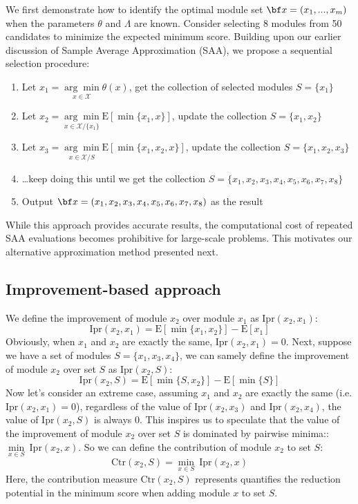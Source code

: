 \documentclass[opre,sglanonrev]{informs4}
\begin{document}
We first demonstrate how to identify the optimal module set ${\bf x} = (x_{1},...,x_{m})$ when the parameters $\theta$ and $\Lambda$ are known. Consider selecting 8 modules from 50 candidates to minimize the expected minimum score. Building upon our earlier discussion of Sample Average Approximation (SAA), we propose a sequential selection procedure:
\begin{enumerate}
	\item Let $x_1 = \underset{x\in \mathcal{X}}{{\arg\min}} \theta(x)$, get the collection of selected modules $S = \{x_1\}$
	\item Let $x_2 = \underset{x\in \mathcal{X}/\{x_1\}}{{\arg\min}}\text{E}[\min\{x_1, x\}]$, update the collection $S = \{x_1,x_2\}$
	\item Let $x_3 = \underset{x\in \mathcal{X}/S}{{\arg\min}}\text{E}[\min\{x_1, x_2, x\}]$, update the collection $S = \{x_1,x_2,x_3\}$
	\item \ldots keep doing this until we get the collection $S = \{x_1,x_2,x_3,x_4,x_5,x_6,x_7,x_8\}$
	\item Output ${\bf x} = (x_1,x_2,x_3,x_4,x_5,x_6,x_7,x_8)$ as the result
\end{enumerate}
While this approach provides accurate results, the computational cost of repeated SAA evaluations becomes prohibitive for large-scale problems. This motivates our alternative approximation method presented next.

\subsection{Improvement-based approach}
We define the improvement of module $x_2$ over module $x_1$ as $\text{Ipr}(x_2, x_1)$:
$$
\text{Ipr}(x_2, x_1) = \text{E}[\min\{x_1, x_2\}]-\text{E}[x_1] 
$$
Obviously, when $x_1$ and $x_2$ are exactly the same, $\text{Ipr}(x_2, x_1) = 0$.
Next, suppose we have a set of modules $S = \{x_1,x_3,x_4\}$, we can samely define the improvement of module $x_2$ over set $S$ as $\text{Ipr}(x_2, S)$:
$$
\text{Ipr}(x_2, S) = \text{E}[\min\{S, x_2\}]-\text{E}[\min\{S\}]
$$
Now let's consider an extreme case, assuming $x_1$ and $x_2$ are exactly the same (i.e. $\text{Ipr}(x_2, x_1)=0$), regardless of the value of $\text{Ipr}(x_2, x_3)$ and $\text{Ipr}(x_2, x_4)$, the value of $\text{Ipr}(x_2, S)$ is always $0$. This inspires us to speculate that the value of the improvement of module $x_2$ over set $S$ is dominated by pairwise minima:: $\underset{x\in S}{{\min}}~\text{Ipr}(x_2,x)$. So we can define the contribution of module $x_2$ to set $S$: 
$$
\text{Ctr}(x_2, S) = \underset{x\in S}{{\min}}~\text{Ipr}(x_2,x)
$$
Here, the contribution measure $\text{Ctr}(x_2, S)$ represents quantifies the reduction potential in the minimum score when adding module $x$ to set $S$.
\end{document}
